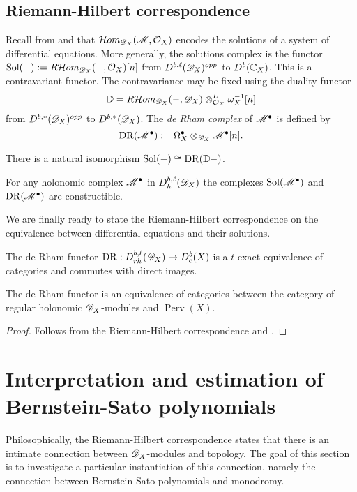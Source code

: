 \subsection{Riemann-Hilbert correspondence}
  Recall from  and  that $\mathcal{H}om_{\mathscr{D}_X}(\mathscr{M}, \mathcal{O}_X)$ encodes the solutions of a system of differential equations.
  More generally, the solutions complex is the functor $\operatorname{Sol}({-}) := R \mathcal{H}om_{\mathscr{D}_X}({-},\mathcal{O}_X)[n]$ from $D^{b,\ell}(\mathscr{D}_X)^{opp}$ to $D^{b}(\mathbb{C}_X)$.
  This is a contravariant functor.
  The contravariance may be fixed using the duality functor
  $$\mathbb{D} = R\mathcal{H}om_{\mathscr{D}_X}({-},\mathscr{D}_X)\otimes_{\mathcal{O}_X}^L\omega_X^{-1}[n]$$
  from $D^{b,*}(\mathscr{D}_X)^{opp}$ to $D^{b,*}(\mathscr{D}_X)$.
  The {\it de Rham complex} of $\mathscr{M}^\bullet$ is defined by
  $$\operatorname{DR}(\mathscr{M}^\bullet):=\Omega_X^\bullet \otimes_{\mathscr{D}_X} \mathscr{M}^\bullet[n]. $$
  \begin{proposition}{\cite[Theorem 5.3.1. ]{dimca2004sheaves}}
    There is a natural isomorphism $\operatorname{Sol}({-}) \cong \operatorname{DR}(\mathbb{D}{-})$.
  \end{proposition}
  \begin{proposition}{\cite[Theorem 5.3.1.]{dimca2004sheaves}}
    For any holonomic complex $\mathscr{M}^\bullet$ in $D_h^{b,\ell}(\mathscr{D}_X)$ the complexes $\operatorname{Sol}(\mathscr{M}^\bullet)$ and $\operatorname{DR}(\mathscr{M}^\bullet)$ are constructible.
  \end{proposition}
  We are finally ready to state the Riemann-Hilbert correspondence on the equivalence between differential equations and their solutions.
  \begin{theorem}
    The de Rham functor $\operatorname{DR}:D_{rh}^{b,\ell}(\mathscr{D}_X)\allowbreak \to D_c^b(X)$ is a $t$-exact equivalence of categories and commutes with direct images.
  \end{theorem}
  \begin{corollary}
    The de Rham functor is an equivalence of categories between the category of regular holonomic $\mathscr{D}_X$-modules and $\operatorname{Perv}(X)$.
  \end{corollary}
  \begin{proof}
    Follows from the Riemann-Hilbert correspondence and .
  \end{proof}
\section{Interpretation and estimation of Bernstein-Sato polynomials}\label{sec: MonodromyBS}
Philosophically, the Riemann-Hilbert correspondence states that there is an intimate connection between $\mathscr{D}_X$-modules and topology.
The goal of this section is to investigate a particular instantiation of this connection, namely the connection between Bernstein-Sato polynomials and monodromy.


